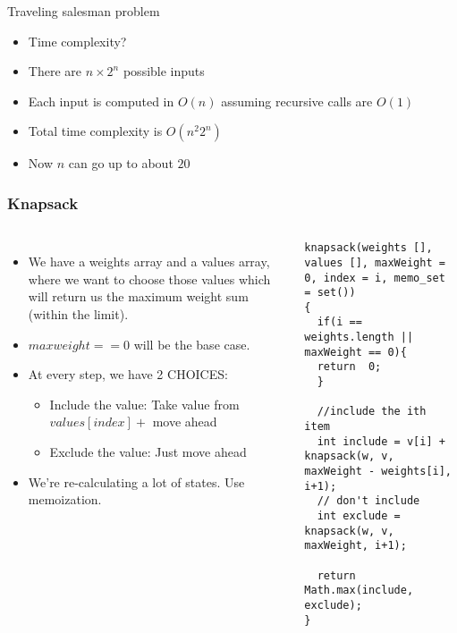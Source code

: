 \begin{frame}[fragile]{Traveling salesman problem}
    \begin{itemize}
        \item Time complexity?
        \item There are $n \times 2^n$ possible inputs
        \item Each input is computed in $O(n)$ assuming recursive calls are $O(1)$
        \item Total time complexity is $O(n^2 2^n)$
        \item Now $n$ can go up to about $20$
    \end{itemize}
\end{frame}

\begin{frame}[fragile]
	\frametitle{Knapsack}
	
	\begin{columns}[T]
			\begin{itemize}
				\item We have a weights array and a values array, where we want to choose those values which will return us 
the maximum weight sum (within the limit). 
				\item $max weight == 0$ will be the base case. 				
\item At every step, we have 2 
CHOICES:
			\begin{itemize}
				\item Include the value: Take value from $values[index] +$ move ahead 
				\item Exclude the value: Just move ahead 
			\end{itemize}
			\item We’re re-calculating a lot of states. Use memoization.
			\end{itemize}
\begin{lstlisting}
knapsack(weights [], values [], maxWeight = 0, index = i, memo_set = set()) 
{ 
  if(i ==  weights.length || maxWeight == 0){ 
  return  0; 
  } 
 
  //include the ith item 
  int include = v[i] + knapsack(w, v, maxWeight - weights[i], i+1); 
  // don't include 
  int exclude =  knapsack(w, v, maxWeight, i+1); 
 
  return Math.max(include, exclude); 
} 
\end{lstlisting}			
		
		
	\end{columns}		
\end{frame}


